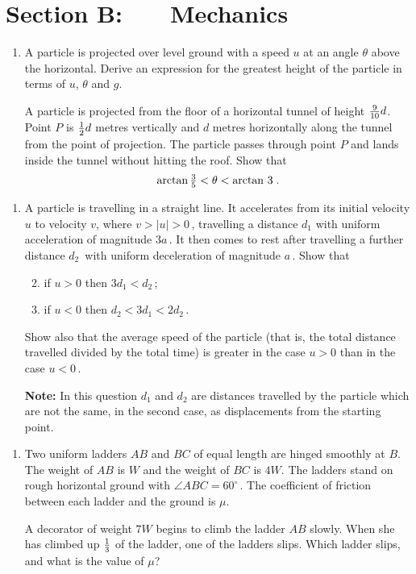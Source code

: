 \documentclass[a4, 11pt]{report}
\newlength{\qspace}
\newcounter{qnumber}
\newenvironment{question}%
 {\vspace{\qspace}
  \begin{enumerate}[\bfseries 1\quad][10]%
    \setcounter{enumi}{\value{qnumber}}%
    \item%
 }
{
  \end{enumerate}
  \filbreak
  \stepcounter{qnumber}
 }
\newenvironment{questionparts}[1][1]%
 {
  \begin{enumerate}[\bfseries (i)]%
    \setcounter{enumii}{#1}
    \addtocounter{enumii}{-1}
    \setlength{\itemsep}{5mm}
    \setlength{\parskip}{8pt}
 }
 {
  \end{enumerate}
 }
\begin{document}
		
	
\newpage
\section*{Section B: \ \ \ Mechanics}


	
\begin{question}
A particle is projected over level ground with a speed  $u$ at 
an angle $\theta$ above the horizontal. 
Derive
 an expression for the greatest height of the particle in terms of $u$, $\theta$ and $g$. 


A  particle is  projected from the floor of a horizontal tunnel of height ${9\over 10}d$. 
Point $P$
 is  ${1\over 2}d$ metres vertically and $d$ metres horizontally along the tunnel
 from the point of 
projection. The particle passes through point $P$ and lands inside the tunnel
without hitting the roof. Show that
\[
\arctan \textstyle {3 \over 5} < \theta < \arctan \, 3 \;.
\]
	\end{question}
	
\begin{question}	
A particle is travelling in a straight line. 
It accelerates from its initial  velocity $u$  to
velocity $v$, where $v > \vert u \vert > 0\,$, travelling a distance $d_1$
with uniform acceleration of magnitude $3a\,$.  
It then comes to rest after travelling
a further distance $d_2\,$ with uniform deceleration of  magnitude $a\,$.
Show that
\begin{questionparts}
\item
if $u>0$ then $3d_1 < d_2\,$;
\item 
if $u<0$ then  $d_2 < 3d_1 < 2d_2\,$. 
\end{questionparts}


Show also that
 the average speed of the particle (that is,  the total distance
travelled divided by the total time)  is greater  in the case $u>0$ than  in the case $u<0\,$.

\noindent
{\bf Note:} In this question $d_1$ and $d_2$ are distances travelled by the particle which
are not the same, in the second case, as displacements from the starting point.
\end{question}


\begin{question}
Two uniform ladders $AB$ and $BC$ of equal length are hinged smoothly at $B$.
The weight of $AB$ is $W$ and the weight of $BC$ is $4W $.
The ladders stand on rough horizontal ground with  $\angle ABC=60^\circ\,$. 
 The coefficient of friction between each ladder  and the 
ground is  $\mu$.


A decorator of weight $7W$ begins to climb the ladder $AB$ slowly. 
When she has climbed up $1 \over 3$ of the ladder, 
one of the ladders slips.
Which ladder  slips, and what is the value of $\mu$?
\end{question}
	
\end{document}
